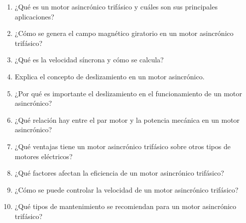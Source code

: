\documentclass[../main]{subfiles}
\begin{document}

\begin{enumerate}
    \item ¿Qué es un motor asincrónico trifásico y cuáles son sus principales aplicaciones?
    \item ¿Cómo se genera el campo magnético giratorio en un motor asincrónico trifásico?
    \item ¿Qué es la velocidad síncrona y cómo se calcula?
    \item Explica el concepto de deslizamiento en un motor asincrónico.
    \item ¿Por qué es importante el deslizamiento en el funcionamiento de un motor asincrónico?
    \item ¿Qué relación hay entre el par motor y la potencia mecánica en un motor asincrónico?
    \item ¿Qué ventajas tiene un motor asincrónico trifásico sobre otros tipos de motores eléctricos?
    \item ¿Qué factores afectan la eficiencia de un motor asincrónico trifásico?
    \item ¿Cómo se puede controlar la velocidad de un motor asincrónico trifásico?
    \item ¿Qué tipos de mantenimiento se recomiendan para un motor asincrónico trifásico?

\end{enumerate}
\end{document}
